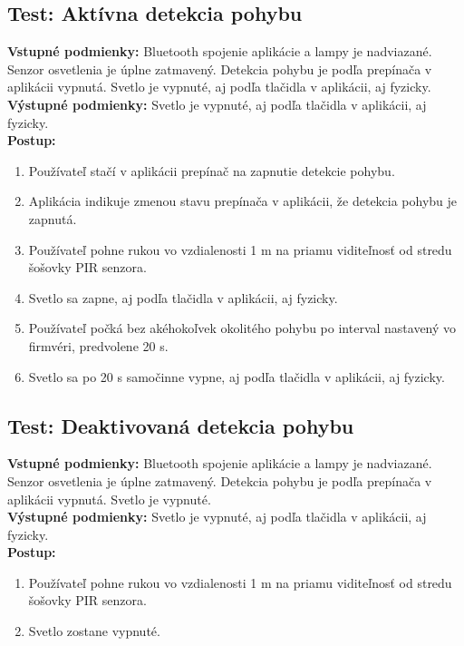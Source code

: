 \documentclass[12pt, a4paper]{article}
\begin{document}
\subsection{Test: Aktívna detekcia pohybu}
\noindent\textbf{Vstupné podmienky:} Bluetooth spojenie aplikácie a lampy je nadviazané. Senzor osvetlenia je úplne zatmavený. Detekcia pohybu je podľa prepínača v aplikácii vypnutá. Svetlo je vypnuté, aj podľa tlačidla v aplikácii, aj fyzicky. \\
\textbf{Výstupné podmienky:} Svetlo je vypnuté, aj podľa tlačidla v aplikácii, aj fyzicky. \\
\textbf{Postup:}
\begin{enumerate}
\itemsep0pt
\item Používateľ stačí v aplikácii prepínač na zapnutie detekcie pohybu.
\item Aplikácia indikuje zmenou stavu prepínača v aplikácii, že detekcia pohybu je zapnutá.
\item Používateľ pohne rukou vo vzdialenosti 1 m na priamu viditeľnosť od stredu šošovky PIR senzora.
\item Svetlo sa zapne, aj podľa tlačidla v aplikácii, aj fyzicky.
\item Používateľ počká bez akéhokoľvek okolitého pohybu po interval nastavený vo firmvéri, predvolene 20 s.
\item Svetlo sa po 20 s samočinne vypne, aj podľa tlačidla v aplikácii, aj fyzicky.
\end{enumerate}

\subsection{Test: Deaktivovaná detekcia pohybu}
\noindent\textbf{Vstupné podmienky:} Bluetooth spojenie aplikácie a lampy je nadviazané. Senzor osvetlenia je úplne zatmavený. Detekcia pohybu je podľa prepínača v aplikácii vypnutá. Svetlo je vypnuté. \\
\textbf{Výstupné podmienky:} Svetlo je vypnuté, aj podľa tlačidla v aplikácii, aj fyzicky. \\
\textbf{Postup:}
\begin{enumerate}
\itemsep0pt
\item Používateľ pohne rukou vo vzdialenosti 1 m na priamu viditeľnosť od stredu šošovky PIR senzora.
\item Svetlo zostane vypnuté.
\end{enumerate}
\end{document}
